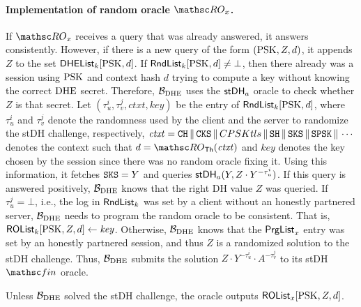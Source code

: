 	\paragraph{Implementation of random oracle $\RO_x$.}
	If $\RO_x$ receives a query that was already answered, it answers consistently.
	However, if there is a new query of the form $(\mathrm{PSK}, Z, d)$, it appends $Z$ to the set $\mathsf{DHEList}_k[\mathrm{PSK}, d]$.
	If $\mathsf{RndList}_k[\mathrm{PSK}, d] \neq \bot$, then there already was a session using $\mathrm{PSK}$ and context hash $d$ trying to compute a key without knowing the correct $\mathrm{DHE}$ secret.
	Therefore, $\mathcal{B}_{\mathrm{DHE}}$ uses the $\mathsf{stDH}_a$ oracle to check whether $Z$ is that secret.
	Let $(\tau_u^i, \tau_v^j, \mathit{ctxt}, \mathit{key})$ be the entry of $\mathsf{RndList}_k[\mathrm{PSK}, d]$, where $\tau_u^i$ and $\tau_v^j$ denote the randomness used by the client and the server to randomize the stDH challenge, respectively, $\mathit{ctxt} = \mathtt{CH} {\,\|\,} \mathtt{CKS} {\,\|\,} \\CPSKtls {\,\|\,} \mathtt{SH} {\,\|\,} \mathtt{SKS} {\,\|\,} \mathtt{SPSK} {\,\|\,} \dotsb$ denotes the context such that $d = \RO_\Thash(\mathit{ctxt})$ and $\mathit{key}$ denotes the key chosen by the session since there was no random oracle fixing it.
	Using this information, it fetches $\mathtt{SKS} = Y$ and queries $\mathsf{stDH}_a(Y, Z \cdot Y^{-\tau_u^i})$.
	If this query is answered positively, $\mathcal{B}_{\mathrm{DHE}}$ knows that the right DH value $Z$ was queried.
	If $\tau_u^j = \bot$, i.e., the log in $\mathsf{RndList}_k$ was set by a client without an honestly partnered server, $\mathcal{B}_{\mathrm{DHE}}$ needs to program the random oracle to be consistent.
	That is, $\mathsf{ROList}_k[\mathrm{PSK}, Z, d] \gets \mathit{key}$.
	Otherwise, $\mathcal{B}_{\mathrm{DHE}}$ knows that the $\mathsf{PrgList}_x$ entry was set by an honestly partnered session, and thus $Z$ is a randomized solution to the stDH challenge.
	Thus, $\mathcal{B}_{\mathrm{DHE}}$ submits the solution $Z \cdot Y^{-\tau_u^i} \cdot A^{-\tau_v^j}$ to its stDH $\Finalize$ oracle.
	
	Unless $\mathcal{B}_{\mathrm{DHE}}$ solved the stDH challenge, the oracle outputs $\mathsf{ROList}_x[\mathrm{PSK}, Z, d]$.
	
